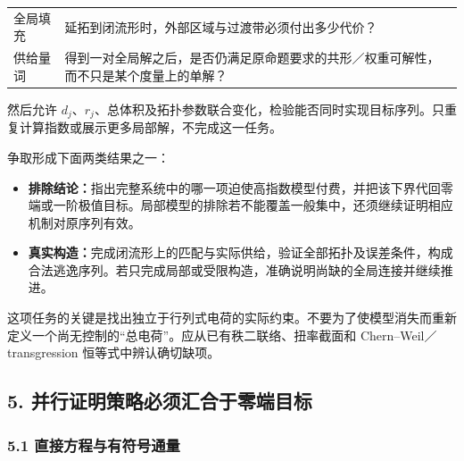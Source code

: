 \documentclass[
  10pt,
]{article}
\providecommand{\tightlist}{%
  \setlength{\itemsep}{0pt}\setlength{\parskip}{0pt}}
\begin{document}
\begin{longtable}[]{@{}>{\raggedright\arraybackslash}p{\dimexpr(\linewidth-2\tabcolsep)/2\relax}>{\raggedright\arraybackslash}p{\dimexpr(\linewidth-2\tabcolsep)/2\relax}@{}}
\begin{minipage}[t]{0.47\columnwidth}
全局填充\strut
\end{minipage} & \begin{minipage}[t]{0.47\columnwidth}\raggedright
延拓到闭流形时，外部区域与过渡带必须付出多少代价？\strut
\end{minipage}\tabularnewline
\begin{minipage}[t]{0.47\columnwidth}\raggedright
供给量词\strut
\end{minipage} & \begin{minipage}[t]{0.47\columnwidth}\raggedright
得到一对全局解之后，是否仍满足原命题要求的共形／权重可解性，而不只是某个度量上的单解？\strut
\end{minipage}\tabularnewline
\bottomrule
\end{longtable}

然后允许
\(d_j\)、\(r_j\)、总体积及拓扑参数联合变化，检验能否同时实现目标序列。只重复计算指数或展示更多局部解，不完成这一任务。

争取形成下面两类结果之一：

\begin{itemize}
\tightlist
\item
  \textbf{排除结论：}指出完整系统中的哪一项迫使高指数模型付费，并把该下界代回零端或一阶极值目标。局部模型的排除若不能覆盖一般集中，还须继续证明相应机制对原序列有效。
\item
  \textbf{真实构造：}完成闭流形上的匹配与实际供给，验证全部拓扑及误差条件，构成合法逃逸序列。若只完成局部或受限构造，准确说明尚缺的全局连接并继续推进。
\end{itemize}

这项任务的关键是找出独立于行列式电荷的实际约束。不要为了使模型消失而重新定义一个尚无控制的``总电荷''。应从已有秩二联络、扭率截面和
Chern--Weil／transgression 恒等式中辨认确切缺项。

\hypertarget{ux5e76ux884cux8bc1ux660eux7b56ux7565ux5fc5ux987bux6c47ux5408ux4e8eux96f6ux7aefux76eeux6807}{%
\subsection{5.
并行证明策略必须汇合于零端目标}\label{ux5e76ux884cux8bc1ux660eux7b56ux7565ux5fc5ux987bux6c47ux5408ux4e8eux96f6ux7aefux76eeux6807}}

\hypertarget{ux76f4ux63a5ux65b9ux7a0bux4e0eux6709ux7b26ux53f7ux901aux91cf}{%
\subsubsection{5.1
直接方程与有符号通量}\label{ux76f4ux63a5ux65b9ux7a0bux4e0eux6709ux7b26ux53f7ux901aux91cf}}
\end{document}

